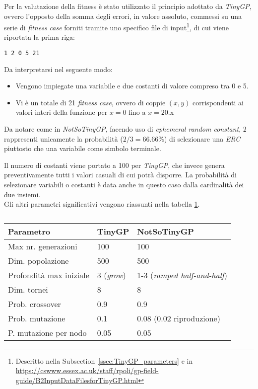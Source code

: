 \documentclass{../llncs}
\newcommand{\xss}[1]{\subsectionname~\ref{ssec:#1}}
\newcommand{\subsectionname}{Subsection}
\begin{document}
Per la valutazione della fitness è stato utilizzato il principio adottato da \emph{TinyGP}, ovvero l'opposto della somma degli errori, in valore assoluto, commessi su una serie di \emph{fitness case} forniti tramite uno specifico file di input\footnote{Descritto nella \xss{TinyGP_parameters} e in \url{https://cswww.essex.ac.uk/staff/rpoli/gp-field-guide/B2InputDataFilesforTinyGP.html}}, di cui viene riportata la prima riga:
\begin{lstlisting}[caption={Prima riga di \texttt{/NotSoTinyGP/resources/polynomial-data.txt}}]
1 2 0 5 21
\end{lstlisting}

\noindent Da interpretarsi nel seguente modo:
\begin{itemize}
\item Vengono impiegate una variabile e due costanti di valore compreso tra 0 e 5.
\item Vi è un totale di 21 \emph{fitness case}, ovvero di coppie $(x ,y)$ corrispondenti ai valori interi della funzione per $x=0$ fino a $x=20$.x
\end{itemize}

Da notare come in \emph{NotSoTinyGP}, facendo uso di \emph{ephemeral random constant}, 2 rappresenti unicamente la probabilità ($2/3=66.66\%$) di selezionare una \emph{ERC} piuttosto che una variabile come simbolo terminale.

Il numero di costanti viene portato a 100 per \emph{TinyGP}, che invece genera preventivamente tutti i valori casuali di cui potrà disporre. La probabilità di selezionare variabili o costanti è data anche in questo caso dalla cardinalità dei due insiemi.\\

\noindent Gli altri parametri significativi vengono riassunti nella tabella \ref{tablePolynomialParams}.\\

\begin{table}
\begin{tabular}{l | p{2.7cm} | p{4.3cm}}
\textbf{Parametro} & \textbf{TinyGP} & \textbf{NotSoTinyGP} \\ \hline
Max nr. generazioni & 100 & 100 \\ \hline
Dim. popolazione & 500 & 500 \\ \hline 
Profondità max iniziale & 3 (\emph{grow}) & 1-3 (\emph{ramped half-and-half}) \\ \hline
Dim. tornei & 8 & 8 \\ \hline
Prob. crossover & 0.9 & 0.9 \\ \hline
Prob. mutazione & 0.1 & 0.08 (0.02 riproduzione) \\ \hline
P. mutazione per nodo & 0.05 & 0.05 \\ \hline
\end{tabular}
\caption{} \label{tablePolynomialParams}
\end{table}
\end{document}
